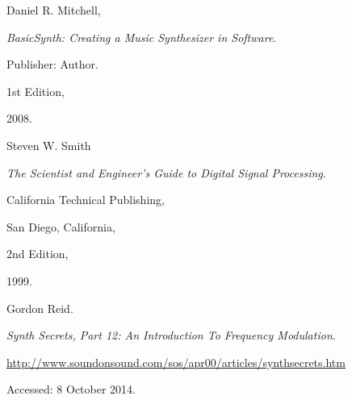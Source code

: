 \documentclass{report}
\begin{document}
  \begin{thebibliography}{99}


      Daniel R. Mitchell,

      \emph{BasicSynth: Creating a Music Synthesizer in Software}.

      Publisher: Author.

      1st Edition,

      2008.


      Steven W. Smith

      \emph{The Scientist and Engineer's Guide to Digital Signal Processing}.

      California Technical Publishing,

      San Diego, California,

      2nd Edition,

      1999.


      Gordon Reid.

      \emph{Synth Secrets, Part 12: An Introduction To Frequency Modulation}.

      \url{http://www.soundonsound.com/sos/apr00/articles/synthsecrets.htm}

      Accessed: 8 October 2014.

  \end{thebibliography}
\end{document}
